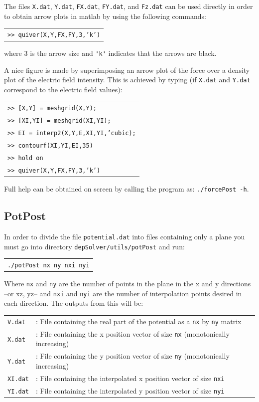 \documentclass[12pt]{article}
\begin{document}
The files \verb+X.dat+, \verb+Y.dat+, \verb+FX.dat+, \verb+FY.dat+, and \verb+Fz.dat+ can be used directly in order to obtain arrow plots in matlab by using the following commands:

\begin{tabular}{l}
\texttt{>> quiver(X,Y,FX,FY,3,'k')}
\end{tabular}

where 3 is the arrow size and \verb+'k'+ indicates that the arrows are black.

A nice figure is made by superimposing an arrow plot of the force over a density plot of the electric field intensity. This is achieved by typing (if \verb+X.dat+ and \verb+Y.dat+ correspond to the electric field values):

\begin{tabular}{l}
\texttt{>> [X,Y] = meshgrid(X,Y);}\\
\texttt{>> [XI,YI] = meshgrid(XI,YI);}\\
\texttt{>> EI = interp2(X,Y,E,XI,YI,'cubic);}\\
\texttt{>> contourf(XI,YI,EI,35)}\\
\texttt{>> hold on}\\
\texttt{>> quiver(X,Y,FX,FY,3,'k')}
\end{tabular}

Full help can be obtained on screen by calling the program as: \texttt{./forcePost -h}.

\subsection{PotPost} 
In order to divide the file \verb+potential.dat+ into files containing only a plane you must go into directory \verb+depSolver/utils/potPost+ and run:

\begin{tabular}{l}
\texttt{./potPost nx ny nxi nyi}
\end{tabular}

Where \verb+nx+ and \verb+ny+ are the number of points in the plane in the x and y directions --or xz, yz-- and \verb+nxi+ and \verb+nyi+ are the number of interpolation points desired in each direction. The outputs from this will be:

\begin{tabular}{ll}
\texttt{V.dat} &: File containing the real part of the potential as a \verb+nx+ by \verb+ny+ matrix\\
\texttt{X.dat} &: File containing the x position vector of size \verb+nx+ (monotonically increasing)\\
\texttt{Y.dat} &: File containing the y position vector of size \verb+ny+ (monotonically increasing)\\
\texttt{XI.dat} &: File containing the interpolated x position vector of size \verb+nxi+\\
\texttt{YI.dat} &: File containing the interpolated y position vector of size \verb+nyi+
\end{tabular}
\end{document}
